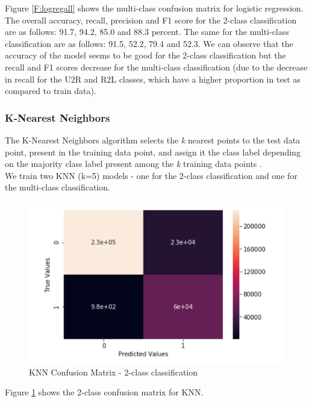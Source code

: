 Figure \ref{F:logregall} shows the multi-class confusion matrix for logistic regression.\\
The overall accuracy, recall, precision and F1 score for the 2-class classification are as follows: 91.7, 94.2, 85.0 and 88.3 percent. The same for the multi-class classification are as follows: 91.5, 52.2, 79.4 and
52.3. We can observe that the accuracy of the model seems to be good for the 2-class classification but the recall and F1 scores decrease for the multi-class classification (due to the decrease in recall for the U2R and R2L classes, which have a higher proportion in test as compared to train data).

\subsubsection{K-Nearest Neighbors}
The K-Nearest Neighbors algorithm selects the {\em k} nearest points to the test data point, present in the training data point, and assign it the class label depending on the majority class label present among the {\em k} training data points \cite{islr09}.\\
We train two KNN (k=5) models - one for the 2-class classification and one for the multi-class classification. 
\begin{figure}
	\includegraphics[width=1.0\columnwidth]{images/knn2.PNG}
	\caption{KNN Confusion Matrix - 2-class classification}
	\label{F:knn2}
\end{figure}
Figure \ref{F:knn2} shows the 2-class confusion matrix for KNN.
